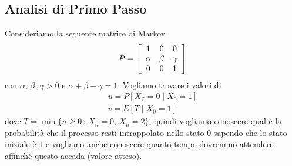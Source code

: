 \documentclass{article}
\newtheorem{proposizione}{Proposizione}[section]
\newtheorem*{dimostrazione*}{Dimostrazione}
\newcommand*{\QED}{\hfill\ensuremath{\Box}}
\begin{document}

\subsection{Analisi di Primo Passo}

Consideriamo la seguente matrice di Markov
\begin{align*}
P = \left[\begin{array}{c c c}
1 & 0 & 0\\
\alpha & \beta & \gamma\\
0 & 0 & 1
\end{array}
\right]
\end{align*}
con $\alpha,\,\beta\,,\gamma > 0$ e $\alpha + \beta + \gamma = 1$.
Vogliamo trovare i valori di
\begin{gather*}
u = P[X_T = 0 \mid X_0 = 1]\\
v = E[T \mid X_0 = 1]
\end{gather*}
dove $T = \min\{n \ge 0\,:\,X_n = 0,\,X_n = 2\}$, quindi vogliamo conoscere qual è la probabilità che il processo resti intrappolato nello stato $0$ sapendo che lo stato iniziale è $1$ e vogliamo anche conoscere quanto tempo dovremmo attendere affinché questo accada (valore atteso).\\
\end{document}
